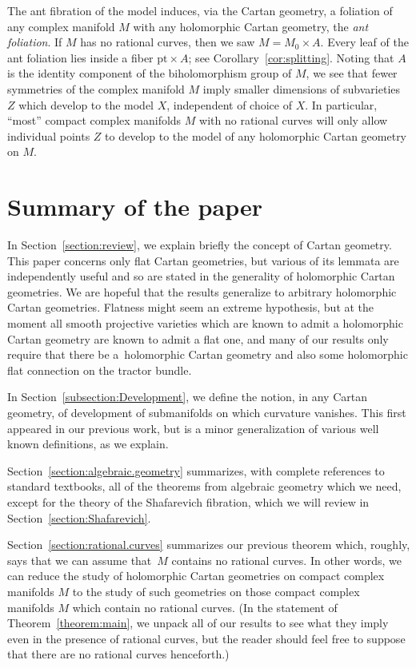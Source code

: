 \documentclass[pdftex]{sigma}
\numberwithin{equation}{section}
\begin{document}
The ant fibration of the model induces, via the Cartan geometry, a foliation of any complex manifold $M$ with any holomorphic Cartan
geometry, the \emph{ant foliation}. If $M$ has no rational curves, then we saw $M = M_0\times A$. Every leaf of the ant foliation lies
inside a fiber $\text{pt}\times A$; see Corollary~\ref{cor:splitting}. Noting that $A$ is the identity component of the
biholomorphism group of $M$, we see that fewer symmetries of the complex manifold $M$ imply smaller dimensions of subvarieties~$Z$
which develop to the model $X$, independent of choice of $X$. In particular, ``most'' compact complex manifolds $M$ with no rational
curves will only allow individual points $Z$ to develop to the model of any holomorphic Cartan geometry on $M$.



\section{Summary of the paper}

In Section~\ref{section:review}, we explain briefly the concept of Cartan geometry. This paper concerns only flat Cartan geometries, but
various of its lemmata are independently useful and so are stated in the generality of holomorphic Cartan geometries. We are hopeful that
the results generalize to arbitrary holomorphic Cartan geometries. Flatness might seem an extreme hypothesis, but at the moment all smooth
projective varieties which are known to admit a holomorphic Cartan geometry are known to admit a flat one, and many of our results only
require that there be a~holomorphic Cartan geometry and also some holomorphic flat connection on the tractor bundle.

In Section~\ref{subsection:Development}, we define the notion, in any Cartan geometry, of development of submanifolds on which curvature vanishes.
This first appeared in our previous work, but is a minor generalization of various well known definitions, as we explain.

Section~\ref{section:algebraic.geometry} summarizes, with complete references to standard textbooks, all of the theorems from algebraic geometry which we need, except for the theory of the Shafarevich fibration, which we will review in Section~\ref{section:Shafarevich}.

Section~\ref{section:rational.curves} summarizes our previous theorem which, roughly, says that we can assume that~$M$ contains no rational curves.
In other words, we can reduce the study of holomorphic Cartan geometries on
compact complex manifolds $M$ to the study of such geometries on those compact complex manifolds $M$ which contain no rational curves.
(In the statement of Theorem~\ref{theorem:main}, we unpack all of our results to see what they imply even in the presence of rational
curves, but the reader should feel free to suppose that there are no rational curves henceforth.)
\end{document}
